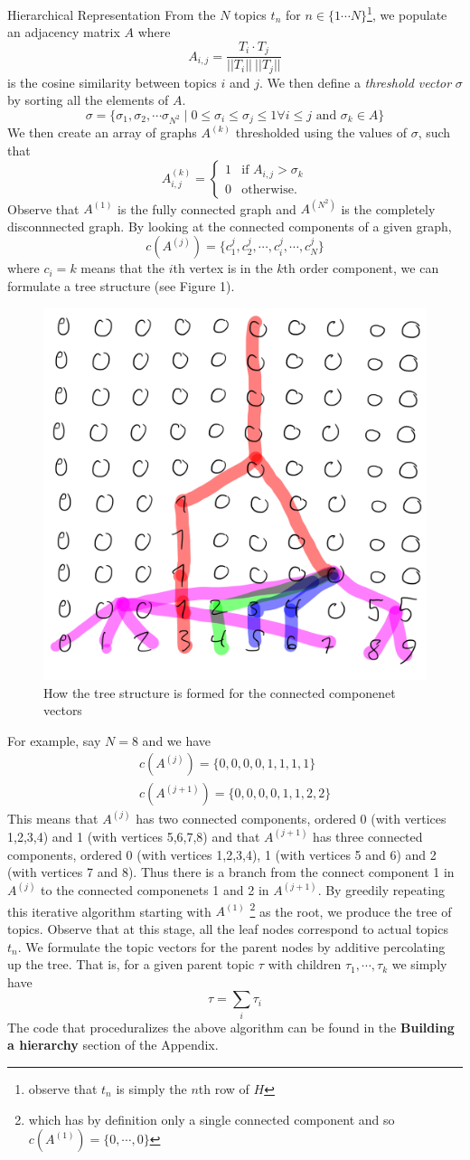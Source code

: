\documentclass[12pt]{pom_thesis}
\begin{document}
\begin{chapter}{Hierarchical Representation}
From the $N$ topics $t_n$ for $n \in \{1\cdots N\}$\footnote{observe that $t_n$ is simply the $n$th row of $H$}, we populate an adjacency matrix $A$ where $$A_{i,j} = \frac{T_i \cdot T_j}{||T_i|| \ ||T_j||}$$ is the cosine similarity between topics $i$ and $j$. We then define a \emph{threshold vector} $\sigma$ by sorting all the elements of $A$. $$\sigma = \{\sigma_1, \sigma_2, \cdots \sigma_{N^2} \mid0 \leq \sigma_{i} \leq \sigma_j \leq 1 \forall i \leq j\text{ and }\sigma_k \in A\}$$
We then create an array of graphs $A^{(k)}$ thresholded using the values of $\sigma$, such that  \[
A^{(k)}_{i,j} =
\begin{cases}
1 & \text{if } A_{i,j} >\sigma_k\\
0 & \text{otherwise.}
\end{cases}
\]
Observe that $A^{(1)}$ is the fully connected graph and $A^{(N^2)}$ is the completely disconnnected graph.
By looking at the connected components  of a given graph,
$$c(A^{(j)})=\{c^j_1, c^j_2,\cdots,c^j_i,\cdots,c^j_N\}$$
where $c_i =k$ means that the $i$th vertex is in the $k$th order component, we can formulate a tree structure (see Figure 1).
\begin{figure}
	\centering
	\includegraphics[width=.5\textwidth]{tree}
	\caption{How the tree structure is formed for the connected componenet vectors}
\end{figure}
For example, say $N=8$ and we have
\begin{align*}
c(A^{(j)})=\{0, 0, 0 ,0, 1 ,1 ,1, 1\}\\
c(A^{(j+1)})=\{0, 0, 0 ,0, 1 ,1 ,2, 2\}
\end{align*}
This means that $A^{(j)}$ has two connected components, ordered 0 (with vertices 1,2,3,4) and 1 (with vertices 5,6,7,8) and that $A^{(j+1)}$ has three connected components, ordered 0 (with vertices 1,2,3,4), 1 (with vertices 5 and 6) and 2 (with vertices 7 and 8).  Thus there is a branch from the connect component 1 in $A^{(j)}$ to the connected componenets 1 and 2 in $A^{(j+1)}$. By greedily repeating this iterative algorithm starting with $A^{(1)}$ \footnote{which has by definition only a single connected component and so $c(A^{(1)})=\{0, \cdots, 0\}$} as the root, we produce the tree of topics. Observe that at this stage, all the leaf nodes correspond to actual topics $t_n$. We formulate the topic vectors for the parent nodes by additive percolating up the tree. That is, for a given parent topic $\tau$ with children $\tau_1, \cdots, \tau_k$ we simply have 
$$\tau =\sum_i \tau_i $$
The code that proceduralizes the above algorithm can be found in the \textbf{Building a hierarchy} section of the Appendix.

\end{chapter}
\end{document}
